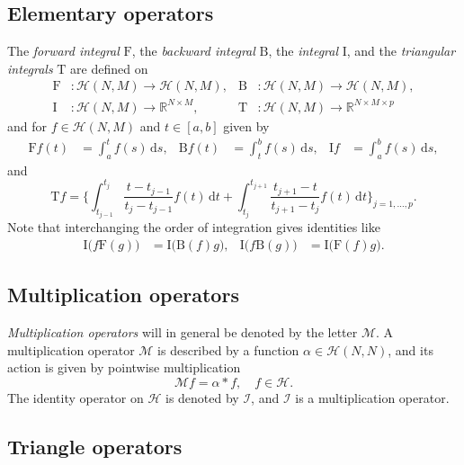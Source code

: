 \documentclass[12pt,a4paper]{article}
\newcommand{\Rset}{\mathbb{R}}
\newcommand{\df}{\text{d}}
\newcommand{\Iop}{\mathcal{I}}
\newcommand{\Mop}{\mathcal{M}}
\begin{document}
\subsection{Elementary operators}

The \emph{forward integral} $\mathrm{F}$, the \emph{backward integral} $\mathrm{B}$, the \emph{integral} $\mathrm{I}$, and the \emph{triangular integrals} $\mathrm{T}$ are defined on
\begin{align*}
\mathrm{F}&\colon \mathcal{H}(N,M) \to \mathcal{H}(N,M), &
\mathrm{B}&\colon \mathcal{H}(N,M) \to \mathcal{H}(N,M), \\
\mathrm{I}&\colon \mathcal{H}(N,M) \to \Rset^{N \times M}, &
\mathrm{T}&\colon \mathcal{H}(N,M) \to \Rset^{N \times M \times p}
\end{align*}
and for $f \in \mathcal{H}(N,M)$ and $t \in [a,b]$ given by
\begin{align*}
\mathrm{F} f(t) &= \int_a^t f(s)\, \df s, &
\mathrm{B} f(t) &= \int_t^b f(s)\, \df s, &
\mathrm{I} f &= \int_a^b f(s)\, \df s,
\end{align*}
and
\begin{equation*}
\mathrm{T} f = \Bigg\{ \int_{t_{j-1}}^{t_j} \frac{t-t_{j-1}}{t_j-t_{j-1}} f(t)\, \df t + \int_{t_j}^{t_{j+1}} \frac{t_{j+1}-t}{t_{j+1}-t_j} f(t)\, \df t \Bigg\}_{j=1,\dotsc,p}.
\end{equation*}
Note that interchanging the order of integration gives identities like
\begin{align*}
\mathrm{I}\big( f \mathrm{F}(g) \big) &= \mathrm{I}\big( \mathrm{B}(f) g \big), &
\mathrm{I}\big( f \mathrm{B}(g) \big) &= \mathrm{I}\big( \mathrm{F}(f) g \big).
\end{align*}


\subsection{Multiplication operators} \label{sec:M}

\emph{Multiplication operators} will in general be denoted by the letter $\Mop$. A multiplication operator $\Mop$ is described by a function $\alpha \in \mathcal{H}(N,N)$, and its action is given by pointwise multiplication
\begin{equation}
\Mop f = \alpha * f, \quad f \in \mathcal{H}.
\end{equation} 
The identity operator on $\mathcal{H}$ is denoted by $\Iop$, and $\Iop$ is a multiplication operator.

\subsection{Triangle operators} \label{sec:T}
\end{document}
